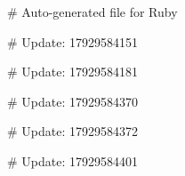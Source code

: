 # Auto-generated file for Ruby

# Update: 17929584151

# Update: 17929584181

# Update: 17929584370

# Update: 17929584372

# Update: 17929584401
